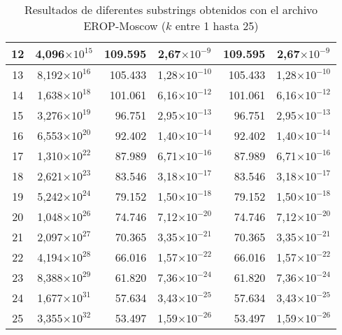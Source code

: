 \begin{table}[!hbt]
\begin{tabular}{| c  r  r  c  r  c |}
    12 & \multicolumn{1}{c}{4,096$\times 10^{15}$} & 109.595 & 2,67$\times 10^{-9}$ & 109.595 & 2,67$\times 10^{-9}$ \\ \hline  
    13 & \multicolumn{1}{c}{8,192$\times 10^{16}$} & 105.433 & 1,28$\times 10^{-10}$ & 105.433 & 1,28$\times 10^{-10}$ \\ \hline
    14 & \multicolumn{1}{c}{1,638$\times 10^{18}$} & 101.061 & 6,16$\times 10^{-12}$ & 101.061 & 6,16$\times 10^{-12}$ \\ \hline  
    15 & \multicolumn{1}{c}{3,276$\times 10^{19}$} & 96.751 & 2,95$\times 10^{-13}$ & 96.751 & 2,95$\times 10^{-13}$ \\ \hline
    16 & \multicolumn{1}{c}{6,553$\times 10^{20}$} & 92.402 & 1,40$\times 10^{-14}$ & 92.402 & 1,40$\times 10^{-14}$ \\ \hline  
    17 & \multicolumn{1}{c}{1,310$\times 10^{22}$} & 87.989 & 6,71$\times 10^{-16}$ & 87.989 & 6,71$\times 10^{-16}$ \\ \hline
    18 & \multicolumn{1}{c}{2,621$\times 10^{23}$} & 83.546 & 3,18$\times 10^{-17}$ & 83.546 & 3,18$\times 10^{-17}$ \\ \hline  
    19 & \multicolumn{1}{c}{5,242$\times 10^{24}$} & 79.152 & 1,50$\times 10^{-18}$ & 79.152 & 1,50$\times 10^{-18}$ \\ \hline
    20 & \multicolumn{1}{c}{1,048$\times 10^{26}$} & 74.746 & 7,12$\times 10^{-20}$ & 74.746 & 7,12$\times 10^{-20}$ \\ \hline  
    21 & \multicolumn{1}{c}{2,097$\times 10^{27}$} & 70.365 & 3,35$\times 10^{-21}$ & 70.365 & 3,35$\times 10^{-21}$ \\ \hline
    22 & \multicolumn{1}{c}{4,194$\times 10^{28}$} & 66.016 & 1,57$\times 10^{-22}$ & 66.016 & 1,57$\times 10^{-22}$ \\ \hline  
    23 & \multicolumn{1}{c}{8,388$\times 10^{29}$} & 61.820 & 7,36$\times 10^{-24}$ & 61.820 & 7,36$\times 10^{-24}$ \\ \hline
    24 & \multicolumn{1}{c}{1,677$\times 10^{31}$} & 57.634 & 3,43$\times 10^{-25}$ & 57.634 & 3,43$\times 10^{-25}$ \\ \hline  
    25 & \multicolumn{1}{c}{3,355$\times 10^{32}$} & 53.497 & 1,59$\times 10^{-26}$ & 53.497 & 1,59$\times 10^{-26}$ \\ \hline        
    \end{tabular}
    \caption{Resultados de diferentes substrings obtenidos con el archivo EROP-Moscow ($k$ entre 1 hasta 25)}
    \label{tb:labela31}
\end{table}

